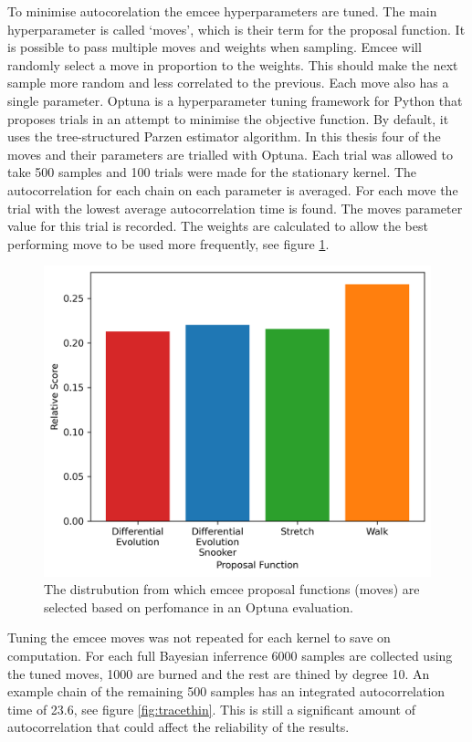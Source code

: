 To minimise autocorelation the emcee hyperparameters are tuned. The main hyperparameter is called `moves', which is their term for the proposal function. It is possible to pass multiple moves and weights when sampling. Emcee will randomly select a move in proportion to the weights. This should make the next sample more random and less correlated to the previous. Each move also has a single parameter. Optuna is a hyperparameter tuning framework for Python that proposes trials in an attempt to minimise the objective function. By default, it uses the tree-structured Parzen estimator algorithm. In this thesis four of the moves and their parameters are trialled with Optuna. Each trial was allowed to take 500 samples and 100 trials were made for the stationary kernel. The autocorrelation for each chain on each parameter is averaged. For each move the trial with the lowest average autocorrelation time is found. The moves parameter value for this trial is recorded. The weights are calculated to allow the best performing move to be used more frequently, see figure \ref{fig:optuna}. 

\begin{figure}[H]
    \centering
    \includegraphics[width=380pt]{images/Final/optuna.png}
    \caption{The distrubution from which emcee proposal functions (moves) are selected based on perfomance in an Optuna evaluation.}
    \label{fig:optuna}
\end{figure}

Tuning the emcee moves was not repeated for each kernel to save on computation. For each full Bayesian inferrence 6000 samples are collected using the tuned moves, 1000 are burned and the rest are thined by degree 10. An example chain of the remaining 500 samples has an integrated autocorrelation time of 23.6, see figure \ref{fig:tracethin}. This is still a significant amount of autocorrelation that could affect the reliability of the results.

